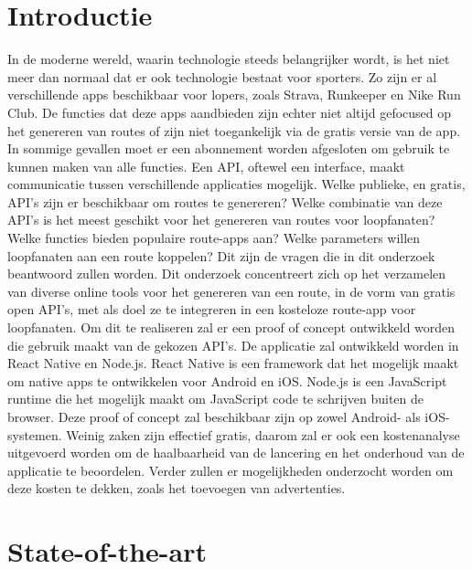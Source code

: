 
\section{Introductie}%
\label{sec:introductie}

In de moderne wereld,
waarin tech\-no\-lo\-gie \@ steeds belangrijker wordt,
is het niet meer dan normaal dat er ook technologie bestaat voor sporters.
Zo zijn er al verschillende apps beschikbaar voor lopers, zoals Strava, Runkeeper en Nike Run Club.
De functies dat deze apps aandbieden zijn echter niet altijd gefocused op het genereren van routes of zijn niet toegankelijk via de gratis versie van de app.
In sommige gevallen moet er een abonnement worden afgesloten om gebruik te kunnen maken van alle functies. Een API, oftewel een interface, maakt communicatie tussen verschillende applicaties mogelijk.
Welke publieke, en gratis, API's zijn er beschikbaar om routes te genereren? Welke combinatie van deze API's is het meest geschikt voor het genereren van routes voor loopfanaten? Welke functies bieden populaire route-apps aan? Welke parameters willen loopfanaten aan een route koppelen? Dit zijn de vragen die in dit onderzoek beantwoord zullen worden.
Dit onderzoek concentreert zich op het verzamelen van diverse online tools voor het genereren van een route, in de vorm van gratis open API's, met als doel ze te integreren in een kosteloze route-app voor loopfanaten.
Om dit te realiseren zal er een proof of concept ontwikkeld worden die gebruik maakt van de gekozen API's. De applicatie zal ontwikkeld worden in React Native en Node.js. React Native is een framework dat het mogelijk maakt om native apps te ontwikkelen voor Android en iOS\@. Node.js is een JavaScript runtime die het mogelijk maakt om JavaScript code te schrijven buiten de browser.
Deze proof of concept zal beschikbaar zijn op zowel Android- als iOS-systemen. Weinig zaken zijn effectief gratis, daarom zal er ook een kostenanalyse uitgevoerd worden om de haalbaarheid van de lancering en het onderhoud van de applicatie te beoordelen.
Verder zullen er mogelijkheden onderzocht worden om deze kosten te dekken, zoals het toevoegen van advertenties.



\section{State-of-the-art}%
\label{sec:state-of-the-art}

